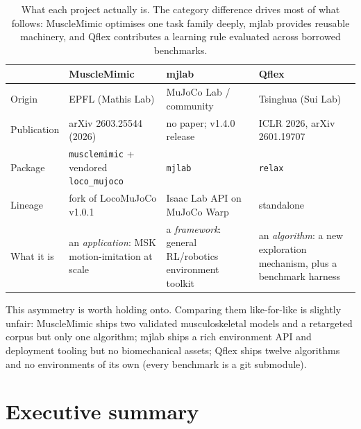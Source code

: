 \documentclass[11pt,a4paper]{article}
\begin{document}
\begin{table}[h!]
\centering
\small
\begin{tabular}{@{}lL{3.3cm}L{3.4cm}L{3.6cm}@{}}
\toprule
 & \textcolor{mmC}{\textbf{MuscleMimic}} & \textcolor{mjC}{\textbf{mjlab}} & \textcolor{qfC}{\textbf{Qflex}} \\
\midrule
Origin      & EPFL (Mathis Lab) & MuJoCo Lab / community & Tsinghua (Sui Lab) \\
Publication & arXiv 2603.25544 (2026) & no paper; v1.4.0 release & ICLR 2026, arXiv 2601.19707 \\
Package     & \texttt{musclemimic} + vendored \texttt{loco\_mujoco} & \texttt{mjlab} & \texttt{relax} \\
Lineage     & fork of LocoMuJoCo v1.0.1 & Isaac Lab API on MuJoCo Warp & standalone \\
What it is  & an \emph{application}: MSK motion-imitation at scale & a \emph{framework}: general RL/robotics environment toolkit & an \emph{algorithm}: a new exploration mechanism, plus a benchmark harness \\
\bottomrule
\end{tabular}
\caption{What each project actually is. The category difference drives most of what follows:
MuscleMimic optimises one task family deeply, mjlab provides reusable machinery,
and Qflex contributes a learning rule evaluated across borrowed benchmarks.}
\end{table}

\noindent
This asymmetry is worth holding onto. Comparing them like-for-like is slightly unfair:
MuscleMimic ships two validated musculoskeletal models and a retargeted corpus but only
one algorithm; mjlab ships a rich environment API and deployment tooling but no
biomechanical assets; Qflex ships twelve algorithms and no environments of its own
(every benchmark is a git submodule).

\section{Executive summary}
\end{document}
